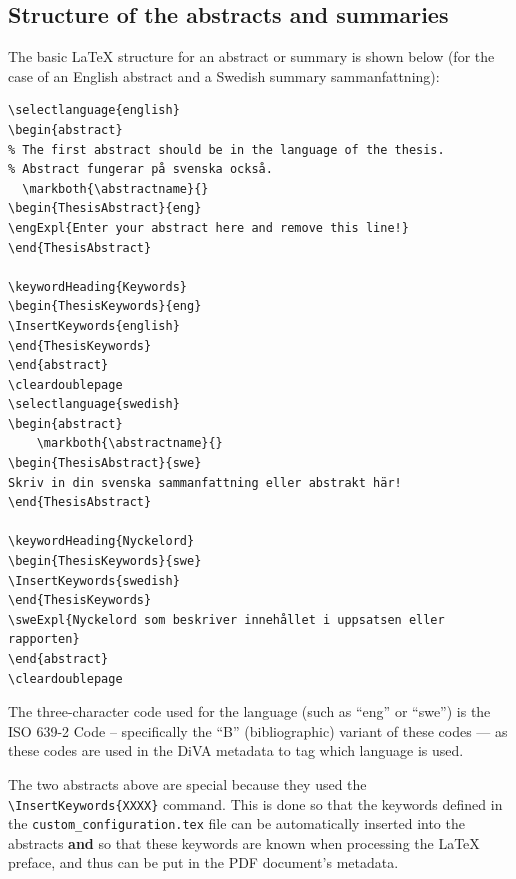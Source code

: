 \documentclass[12pt, twoside]{article}
\newcommand{\fname}[1]{\texttt{#1}}
\begin{document}
\subsection{Structure of the abstracts and summaries}
The basic \LaTeX{}  structure for an abstract or summary is shown below (for the case of an English abstract and a Swedish summary \ie \foreignlanguage{swedish}{sammanfattning}):
\begin{lstlisting}[style=latexExampleForAuthors]
\selectlanguage{english}
\begin{abstract}
% The first abstract should be in the language of the thesis.
% Abstract fungerar på svenska också.
  \markboth{\abstractname}{}
\begin{ThesisAbstract}{eng}
\engExpl{Enter your abstract here and remove this line!}
\end{ThesisAbstract}

\keywordHeading{Keywords}
\begin{ThesisKeywords}{eng}
\InsertKeywords{english}
\end{ThesisKeywords}
\end{abstract}
\cleardoublepage
\selectlanguage{swedish}
\begin{abstract}
    \markboth{\abstractname}{}
\begin{ThesisAbstract}{swe}
Skriv in din svenska sammanfattning eller abstrakt här!
\end{ThesisAbstract}

\keywordHeading{Nyckelord}
\begin{ThesisKeywords}{swe}
\InsertKeywords{swedish}
\end{ThesisKeywords}
\sweExpl{Nyckelord som beskriver innehållet i uppsatsen eller rapporten}
\end{abstract}
\cleardoublepage
\end{lstlisting}

The three-character code used for the language (such as \enquote{eng} or \enquote{swe}) is the ISO 639-2 Code – specifically the \enquote{B} (bibliographic) variant of these codes --- as these codes are used in the \gls{DiVA} metadata to tag which language is used.

The two abstracts above are special because they used the \texttt{\textbackslash InsertKeywords\{XXXX\}} command. This is done so that the keywords defined in the \fname{custom\_configuration.tex} file can be automatically inserted into the abstracts \textbf{and} so that these keywords are known when processing the \LaTeX{} preface, and thus can be put in the \gls{PDF} document's metadata.
\end{document}
